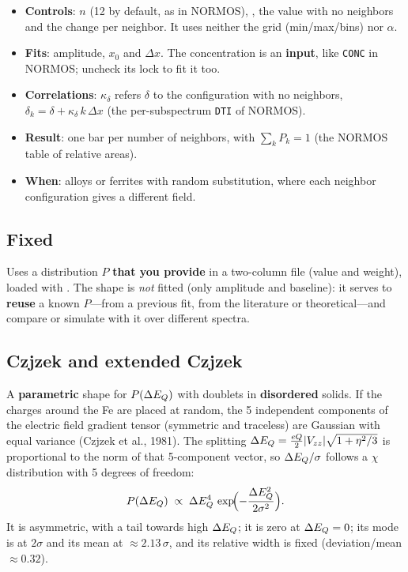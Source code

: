 \begin{itemize}[nosep]
  \item \textbf{Controls}:  $n$ (12 by default, as in NORMOS),
        , the value with no neighbors and the
        change per neighbor. It uses neither the grid (min/max/bins) nor $\alpha$.
  \item \textbf{Fits}: amplitude, $x_0$ and $\Delta x$. The concentration is an
        \textbf{input}, like \texttt{CONC} in NORMOS; uncheck its lock to fit it
        too.
  \item \textbf{Correlations}: $\kappa_\delta$ refers $\delta$ to the
        configuration with no neighbors,
        $\delta_k = \delta + \kappa_\delta\,k\,\Delta x$ (the per-subspectrum
        \texttt{DTI} of NORMOS).
  \item \textbf{Result}: one bar per number of neighbors, with $\sum_k P_k = 1$
        (the NORMOS table of relative areas).
  \item \textbf{When}: alloys or ferrites with random substitution, where each
        neighbor configuration gives a different field.
\end{itemize}

\subsection{Fixed}
\label{sec:forma-fija}

Uses a distribution $P$ \textbf{that you provide} in a two-column file (value and
weight), loaded with . The shape is \emph{not} fitted (only
amplitude and baseline): it serves to \textbf{reuse} a known $P$---from a previous
fit, from the literature or theoretical---and compare or simulate with it over
different spectra.

\subsection{Czjzek and extended Czjzek}
\label{sec:forma-czjzek}

A \textbf{parametric} shape for $P(\Delta E_{Q})$ with doublets in \textbf{disordered}
solids. If the charges around the Fe are placed at random, the 5 independent
components of the electric field gradient tensor (symmetric and traceless) are
Gaussian with equal variance (Czjzek et al., 1981). The splitting
$\Delta E_{Q}=\tfrac{eQ}{2}|V_{zz}|\sqrt{1+\eta^2/3}$ is proportional to the norm of
that 5-component vector, so $\Delta E_{Q}/\sigma$ follows a $\chi$ distribution with 5
degrees of freedom:
\[
  P(\Delta E_{Q}) \;\propto\; \Delta E_{Q}^{4}\,\exp\!\Bigl(-\frac{\Delta E_{Q}^{2}}{2\sigma^{2}}\Bigr).
\]
It is asymmetric, with a tail towards high $\Delta E_{Q}$; it is zero at $\Delta E_{Q}=0$; its
mode is at $2\sigma$ and its mean at $\approx 2.13\,\sigma$, and its relative
width is fixed (deviation/mean $\approx 0.32$).

